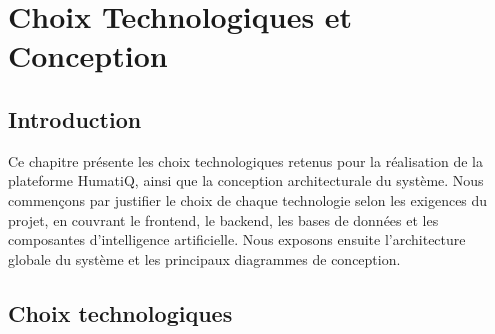 \newpage
\pagestyle{fancy}
\renewcommand{\headrulewidth}{0.5pt}
\renewcommand{\footrulewidth}{0.5pt}
\chapter{Choix Technologiques et Conception}
\setlength{\headheight}{27.06pt}
\label{ch3}
\minitoc
\newpage
\section*{Introduction}
Ce chapitre présente les choix technologiques retenus pour la réalisation de la plateforme HumatiQ, ainsi que la conception architecturale du système. Nous commençons par justifier le choix de chaque technologie selon les exigences du projet, en couvrant le frontend, le backend, les bases de données et les composantes d'intelligence artificielle. Nous exposons ensuite l'architecture globale du système et les principaux diagrammes de conception.
\section{Choix technologiques}
